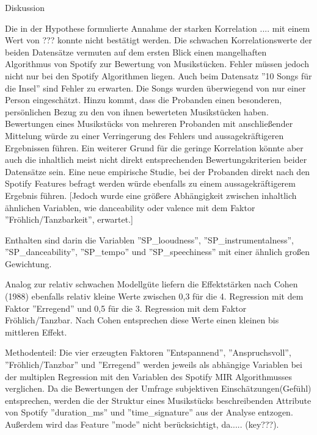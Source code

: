 Diskussion

Die in der Hypothese formulierte Annahme der starken Korrelation .... mit einem Wert von ??? konnte nicht bestätigt werden. 
Die schwachen Korrelationswerte der beiden Datensätze vermuten auf dem ersten Blick einen mangelhaften Algorithmus von Spotify zur Bewertung von Musikstücken.
Fehler müssen jedoch nicht nur bei den Spotify Algorithmen liegen. Auch beim Datensatz ''10 Songs für die Insel'' sind Fehler zu erwarten. Die Songs wurden überwiegend von nur einer Person eingeschätzt. Hinzu kommt, dass die Probanden einen besonderen, persönlichen Bezug zu den von ihnen bewerteten Musikstücken haben. Bewertungen eines Musikstücks von mehreren Probanden mit anschließender Mittelung würde zu einer Verringerung des Fehlers und aussagekräftigeren Ergebnissen führen.
Ein weiterer Grund für die geringe Korrelation könnte aber auch die inhaltlich meist nicht direkt entsprechenden Bewertungskriterien beider Datensätze sein. Eine neue empirische Studie, bei der Probanden direkt nach den Spotify Features befragt werden würde ebenfalls zu einem aussagekräftigerem Ergebnis führen. 
[Jedoch wurde eine größere Abhängigkeit zwischen inhaltlich ähnlichen Variablen, wie danceability oder valence mit dem Faktor ''Fröhlich/Tanzbarkeit'', erwartet.]
 

     


Enthalten sind darin die Variablen ''SP_looudness'', ''SP_instrumentalness'', ''SP_danceability'', ''SP_tempo'' und ''SP_speechiness'' mit einer ähnlich großen Gewichtung.   

Analog zur relativ schwachen Modellgüte liefern die Effektstärken nach Cohen (1988) ebenfalls relativ kleine Werte zwischen 0,3 für die 4. Regression mit dem Faktor ''Erregend'' und 0,5 für die 3. Regression mit dem Faktor Fröhlich/Tanzbar. Nach Cohen entsprechen diese Werte einen kleinen bis mittleren Effekt.


Methodenteil: Die vier erzeugten Faktoren ''Entspannend'', ''Anspruchsvoll'', ''Fröhlich/Tanzbar'' und ''Erregend'' werden jeweils als abhängige Variablen bei der multiplen Regression mit den Variablen des Spotify MIR Algorithmusses verglichen. Da die Bewertungen der Umfrage subjektiven Einschätzungen(Gefühl) entsprechen, werden die der Struktur eines Musikstücks beschreibenden Attribute von Spotify ''duration_ms'' und ''time_signature'' aus der Analyse entzogen. Außerdem wird das Feature ''mode'' nicht berücksichtigt, da..... (key???).
